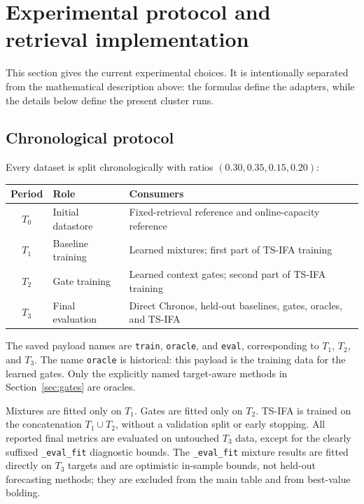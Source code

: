 \documentclass[11pt]{article}
\newcommand{\method}[1]{\texttt{#1}}
\begin{document}
\section{Experimental protocol and retrieval implementation}

This section gives the current experimental choices.  It is intentionally
separated from the mathematical description above: the formulas define the
adapters, while the details below define the present cluster runs.

\subsection{Chronological protocol}

Every dataset is split chronologically with ratios $(0.30,0.35,0.15,0.20)$:

\begin{center}
\begin{tabularx}{\textwidth}{@{}c l X@{}}
\toprule
Period & Role & Consumers \\
\midrule
$T_0$ & Initial datastore & Fixed-retrieval reference and online-capacity reference \\
$T_1$ & Baseline training & Learned mixtures; first part of TS-IFA training \\
$T_2$ & Gate training & Learned context gates; second part of TS-IFA training \\
$T_3$ & Final evaluation & Direct Chronos, held-out baselines, gates, oracles, and TS-IFA \\
\bottomrule
\end{tabularx}
\end{center}

The saved payload names are \method{train}, \method{oracle}, and
\method{eval}, corresponding to $T_1$, $T_2$, and $T_3$.  The name
\method{oracle} is historical: this payload is the training data for the
learned gates.  Only the explicitly named target-aware methods in
Section~\ref{sec:gates} are oracles.

Mixtures are fitted only on $T_1$.  Gates are fitted only on $T_2$.  TS-IFA is
trained on the concatenation $T_1\cup T_2$, without a validation split or early
stopping.  All reported final metrics are evaluated on untouched $T_3$ data,
except for the clearly suffixed \method{\_eval\_fit} diagnostic bounds.  The
\method{\_eval\_fit} mixture results are fitted directly on $T_3$ targets and
are optimistic in-sample bounds, not held-out forecasting methods; they are
excluded from the main table and from best-value bolding.
\end{document}

